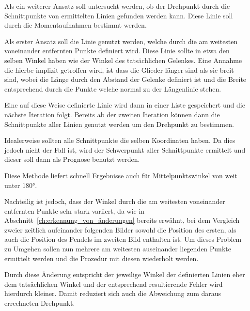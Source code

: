 Als ein weiterer Ansatz soll untersucht werden, ob der Drehpunkt durch die Schnittpunkte von ermittelten Linien gefunden werden kann.
Diese Linie soll durch die Momentaufnahmen bestimmt werden.

Als erster Ansatz soll die Linie genutzt werden, welche durch die am weitesten voneinander entfernten Punkte definiert wird.
Diese Linie sollte in etwa den selben Winkel haben wie der Winkel des tatsächlichen Gelenkes.
Eine Annahme die hierbe implizit getroffen wird, ist dass die Glieder länger sind als sie breit sind, wobei die Länge durch den Abstand der Gelenke definiert ist und die Breite entsprechend durch die Punkte welche normal zu der Längenlinie stehen.

Eine auf diese Weise definierte Linie wird dann in einer Liste gespeichert und die nächste Iteration folgt.
Bereits ab der zweiten Iteration können dann die Schnittpunkte aller Linien genutzt werden um den Drehpunkt zu bestimmen.


Idealerweise sollten alle Schnittpunkte die selben Koordinaten haben.
Da dies jedoch nicht der Fall ist, wird der Schwerpunkt aller Schnittpunkte ermittelt und dieser soll dann als Prognose benutzt werden.

Diese Methode liefert schnell Ergebnisse auch für Mittelpunktswinkel von weit unter 180°.


Nachteilig ist jedoch, dass der Winkel durch die am weitesten voneinander entfernten Punkte sehr stark variiert, da wie in Abschnitt~\ref{ch:erkennung_von_änderungen} bereits erwähnt, bei dem Vergleich zweier zeitlich aufeinander folgenden Bilder sowohl die Position des ersten, als auch die Position des Pendels im zweiten Bild enthalten ist.
Um dieses Problem zu Umgehen sollen nun mehrere am weitesten auseinander liegenden Punkte ermittelt werden und die Prozedur mit diesen wiederholt werden.

Durch diese Änderung entspricht der jeweilige Winkel der definierten Linien eher dem tatsächlichen Winkel und der entsprechend resultierende Fehler wird hierdurch kleiner.
Damit reduziert sich auch die Abweichung zum daraus errechneten Drehpunkt.

